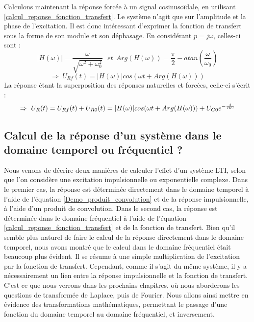 	Calculons maintenant la réponse forcée à un signal
        cosinusoïdale, en utilisant
        \ref{calcul_reponse_fonction_transfert}. Le système n'agit que
        sur l'amplitude et la phase de l'excitation. Il est donc
        intéressant d'exprimer la fonction de transfert sous la forme
        de son module et son déphasage. En considérant $p=j\omega$,
        celles-ci sont :
	\begin{equation*}
          |H(\omega)|=\frac{\omega}{\sqrt{\omega^{2}+\omega_{0}^{2}}}~~~et~~Arg(H(\omega))=\frac{\pi}{2}-atan(\frac{\omega}{\omega_{0}})
	\end{equation*}
	\begin{equation*}
          \Rightarrow~U_{Rf}(t)=|H(\omega)|cos(\omega t+Arg(H(\omega)))
	\end{equation*}
	La réponse étant la superposition des réponses naturelles et
        forcées, celle-ci s'écrit :
	\begin{equation*}
          \Rightarrow~U_{R}(t)=U_{Rf}(t)+U_{R0}(t)=|H(\omega)|cos(\omega t+Arg(H(\omega)))+U_{C0}e^{-\frac{t}{RC}}
	\end{equation*}
	
	\vspace{1\baselineskip}

	\subsection{Calcul de la réponse d'un système dans le domaine
          temporel ou fréquentiel ?}
	
	Nous venons de décrire deux manières de calculer l'effet d'un
        système LTI, selon que l'on considère une excitation
        impulsionnelle ou exponentielle complexe. Dans le premier cas,
        la réponse est déterminée directement dans le domaine temporel
        à l'aide de l'équation \ref{Demo_produit_convolution} et de la
        réponse impulsionnelle, à l'aide d'un produit de
        convolution. Dans le second cas, la réponse est déterminée
        dans le domaine fréquentiel à l'aide de l'équation
        \ref{calcul_reponse_fonction_transfert} et de la fonction de
        transfert.  Bien qu'il semble plus naturel de faire le calcul
        de la réponse directement dans le domaine temporel, nous avons
        montré que le calcul dans le domaine fréquentiel était
        beaucoup plus évident. Il se résume à une simple
        multiplication de l'excitation par la fonction de transfert.
        Cependant, comme il s'agit du même système, il y a
        nécessairement un lien entre la réponse impulsionnelle et la
        fonction de transfert. C'est ce que nous verrons dans les
        prochains chapitres, où nous aborderons les questions de
        transformée de Laplace, puis de Fourier. Nous allons ainsi
        mettre en évidence des transformations mathématiques,
        permettant le passage d'une fonction du domaine temporel au
        domaine fréquentiel, et inversement.
	
